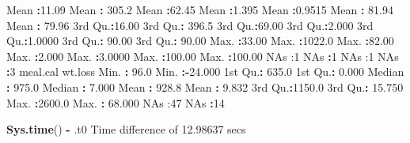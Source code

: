 \documentclass[
]{article}
\newenvironment{Shaded}{\begin{snugshade}}{\end{snugshade}}
\newcommand{\DecValTok}[1]{\textcolor[rgb]{0.00,0.00,0.81}{#1}}
\newcommand{\FloatTok}[1]{\textcolor[rgb]{0.00,0.00,0.81}{#1}}
\newcommand{\FunctionTok}[1]{\textcolor[rgb]{0.13,0.29,0.53}{\textbf{#1}}}
\newcommand{\NormalTok}[1]{#1}
\newcommand{\SpecialCharTok}[1]{\textcolor[rgb]{0.81,0.36,0.00}{\textbf{#1}}}
\newcommand{\StringTok}[1]{\textcolor[rgb]{0.31,0.60,0.02}{#1}}
\begin{document}
\begin{Shaded}
\begin{Highlighting}[]
\NormalTok{ Mean   }\SpecialCharTok{:}\FloatTok{11.09}\NormalTok{   Mean   }\SpecialCharTok{:} \FloatTok{305.2}\NormalTok{   Mean   }\SpecialCharTok{:}\FloatTok{62.45}\NormalTok{   Mean   }\SpecialCharTok{:}\FloatTok{1.395}\NormalTok{   Mean   }\SpecialCharTok{:}\FloatTok{0.9515}\NormalTok{   Mean   }\SpecialCharTok{:} \FloatTok{81.94}\NormalTok{   Mean   }\SpecialCharTok{:} \FloatTok{79.96}  
\NormalTok{ 3rd Qu.}\SpecialCharTok{:}\FloatTok{16.00}\NormalTok{   3rd Qu.}\SpecialCharTok{:} \FloatTok{396.5}\NormalTok{   3rd Qu.}\SpecialCharTok{:}\FloatTok{69.00}\NormalTok{   3rd Qu.}\SpecialCharTok{:}\FloatTok{2.000}\NormalTok{   3rd Qu.}\SpecialCharTok{:}\FloatTok{1.0000}\NormalTok{   3rd Qu.}\SpecialCharTok{:} \FloatTok{90.00}\NormalTok{   3rd Qu.}\SpecialCharTok{:} \FloatTok{90.00}  
\NormalTok{ Max.   }\SpecialCharTok{:}\FloatTok{33.00}\NormalTok{   Max.   }\SpecialCharTok{:}\FloatTok{1022.0}\NormalTok{   Max.   }\SpecialCharTok{:}\FloatTok{82.00}\NormalTok{   Max.   }\SpecialCharTok{:}\FloatTok{2.000}\NormalTok{   Max.   }\SpecialCharTok{:}\FloatTok{3.0000}\NormalTok{   Max.   }\SpecialCharTok{:}\FloatTok{100.00}\NormalTok{   Max.   }\SpecialCharTok{:}\FloatTok{100.00}  
\NormalTok{ NA}\StringTok{\textquotesingle{}s   :1                                                        NA\textquotesingle{}}\NormalTok{s   }\SpecialCharTok{:}\DecValTok{1}\NormalTok{        NA}\StringTok{\textquotesingle{}s   :1        NA\textquotesingle{}}\NormalTok{s   }\SpecialCharTok{:}\DecValTok{3}       
\NormalTok{    meal.cal         wt.loss       }
\NormalTok{ Min.   }\SpecialCharTok{:}  \FloatTok{96.0}\NormalTok{   Min.   }\SpecialCharTok{:{-}}\FloatTok{24.000}  
\NormalTok{ 1st Qu.}\SpecialCharTok{:} \FloatTok{635.0}\NormalTok{   1st Qu.}\SpecialCharTok{:}  \FloatTok{0.000}  
\NormalTok{ Median }\SpecialCharTok{:} \FloatTok{975.0}\NormalTok{   Median }\SpecialCharTok{:}  \FloatTok{7.000}  
\NormalTok{ Mean   }\SpecialCharTok{:} \FloatTok{928.8}\NormalTok{   Mean   }\SpecialCharTok{:}  \FloatTok{9.832}  
\NormalTok{ 3rd Qu.}\SpecialCharTok{:}\FloatTok{1150.0}\NormalTok{   3rd Qu.}\SpecialCharTok{:} \FloatTok{15.750}  
\NormalTok{ Max.   }\SpecialCharTok{:}\FloatTok{2600.0}\NormalTok{   Max.   }\SpecialCharTok{:} \FloatTok{68.000}  
\NormalTok{ NA}\StringTok{\textquotesingle{}s   :47       NA\textquotesingle{}}\NormalTok{s   }\SpecialCharTok{:}\DecValTok{14}       
\end{Highlighting}
\end{Shaded}

\begin{Shaded}
\begin{Highlighting}[]
\FunctionTok{Sys.time}\NormalTok{() }\SpecialCharTok{{-}}\NormalTok{ .t0}
\NormalTok{Time difference of }\FloatTok{12.98637}\NormalTok{ secs}
\end{Highlighting}
\end{Shaded}
\end{document}
